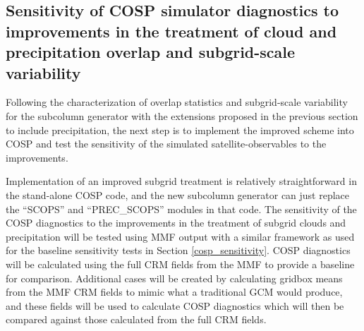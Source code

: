 \documentclass[letter]{article}
\begin{document}

\subsection{Sensitivity of COSP simulator diagnostics to improvements in the treatment of cloud and precipitation overlap and subgrid-scale variability}
Following the characterization of overlap statistics and subgrid-scale variability for the \cite{raisanen_et_al_2004} subcolumn generator with the extensions proposed in the previous section to include precipitation, the next step is to implement the improved scheme into COSP and test the sensitivity of the simulated satellite-observables to the improvements. 

Implementation of an improved subgrid treatment is relatively straightforward in the stand-alone COSP code, and the new subcolumn generator can just replace the ``SCOPS'' and ``PREC\_SCOPS'' modules in that code. The sensitivity of the COSP diagnostics to the improvements in the treatment of subgrid clouds and precipitation will be tested using MMF output with a similar framework as used for the baseline sensitivity tests in Section \ref{cosp_sensitivity}. COSP diagnostics will be calculated using the full CRM fields from the MMF to provide a baseline for comparison. Additional cases will be created by calculating gridbox means from the MMF CRM fields to mimic what a traditional GCM would produce, and these fields will be used to calculate COSP diagnostics which will then be compared against those calculated from the full CRM fields. 
\end{document}
